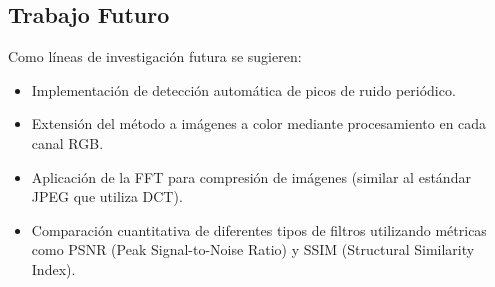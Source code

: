 \documentclass[conference]{IEEEtran}
\begin{document}
\subsection{Trabajo Futuro}

Como líneas de investigación futura se sugieren:
\begin{itemize}
    \item Implementación de detección automática de picos de ruido periódico.
    \item Extensión del método a imágenes a color mediante procesamiento en cada canal RGB.
    \item Aplicación de la FFT para compresión de imágenes (similar al estándar JPEG que utiliza DCT).
    \item Comparación cuantitativa de diferentes tipos de filtros utilizando métricas como PSNR (Peak Signal-to-Noise Ratio) y SSIM (Structural Similarity Index).
\end{itemize}
\end{document}
